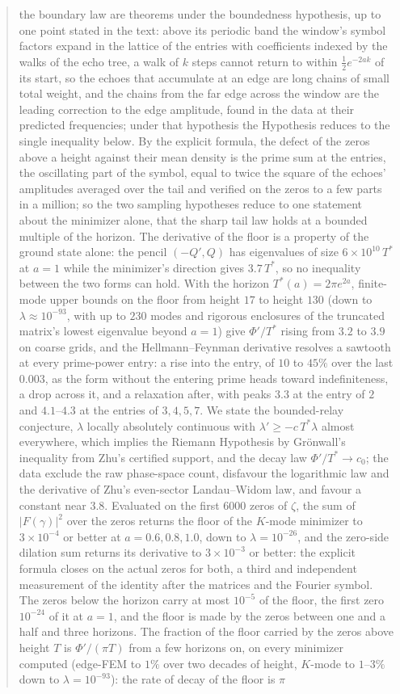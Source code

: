 \documentclass[11pt]{article}
\theoremstyle{definition}
\theoremstyle{remark}
\newcommand{\Tst}{T^{*}}
\begin{document}
\begin{abstract}
the boundary law are theorems under the boundedness hypothesis, up to one point stated in the text: above its periodic band the window's symbol factors expand in the lattice of the entries with coefficients indexed by the walks of the echo tree, a walk of $k$ steps cannot return to within $\tfrac12e^{-2ak}$ of its start, so the echoes that accumulate at an edge are long chains of small total weight, and the chains from the far edge across the window are the leading correction to the edge amplitude, found in the data at their predicted frequencies; under that hypothesis the Hypothesis reduces to the single inequality below. By the explicit formula, the defect of the zeros above a height against their mean density is the prime sum at the entries, the oscillating part of the symbol, equal to twice the square of the echoes' amplitudes averaged over the tail and verified on the zeros to a few parts in a million; so the two sampling hypotheses reduce to one statement about the minimizer alone, that the sharp tail law holds at a bounded multiple of the horizon. The derivative of the floor is a property of the ground state alone: the pencil $(-Q',Q)$ has eigenvalues of size $6\times10^{10}\,\Tst$ at $a=1$ while the minimizer's direction gives $3.7\,\Tst$, so no inequality between the two forms can hold. With the horizon $\Tst(a)=2\pi e^{2a}$, finite-mode upper bounds on the floor from height $17$ to height $130$ (down to $\lambda\approx10^{-93}$, with up to $230$ modes and rigorous enclosures of the truncated matrix's lowest eigenvalue beyond $a=1$) give $\Phi'/\Tst$ rising from $3.2$ to $3.9$ on coarse grids, and the Hellmann--Feynman derivative resolves a sawtooth at every prime-power entry: a rise into the entry, of $10$ to $45\%$ over the last $0.003$, as the form without the entering prime heads toward indefiniteness, a drop across it, and a relaxation after, with peaks $3.3$ at the entry of $2$ and $4.1$--$4.3$ at the entries of $3,4,5,7$. We state the bounded-relay conjecture, $\lambda$ locally absolutely continuous with $\lambda'\ge-c\,\Tst\lambda$ almost everywhere, which implies the Riemann Hypothesis by Gr\"onwall's inequality from Zhu's certified support, and the decay law $\Phi'/\Tst\to c_0$; the data exclude the raw phase-space count, disfavour the logarithmic law and the derivative of Zhu's even-sector Landau--Widom law, and favour a constant near $3.8$. Evaluated on the first $6000$ zeros of $\zeta$, the sum of $|F(\gamma)|^2$ over the zeros returns the floor of the $K$-mode minimizer to $3\times10^{-4}$ or better at $a=0.6,0.8,1.0$, down to $\lambda=10^{-26}$, and the zero-side dilation sum returns its derivative to $3\times10^{-3}$ or better: the explicit formula closes on the actual zeros for both, a third and independent measurement of the identity after the matrices and the Fourier symbol. The zeros below the horizon carry at most $10^{-5}$ of the floor, the first zero $10^{-24}$ of it at $a=1$, and the floor is made by the zeros between one and a half and three horizons. The fraction of the floor carried by the zeros above height $T$ is $\Phi'/(\pi T)$ from a few horizons on, on every minimizer computed (edge-FEM to $1\%$ over two decades of height, $K$-mode to $1$--$3\%$ down to $\lambda=10^{-93}$): the rate of decay of the floor is $\pi$ 
\end{abstract}
\end{document}
